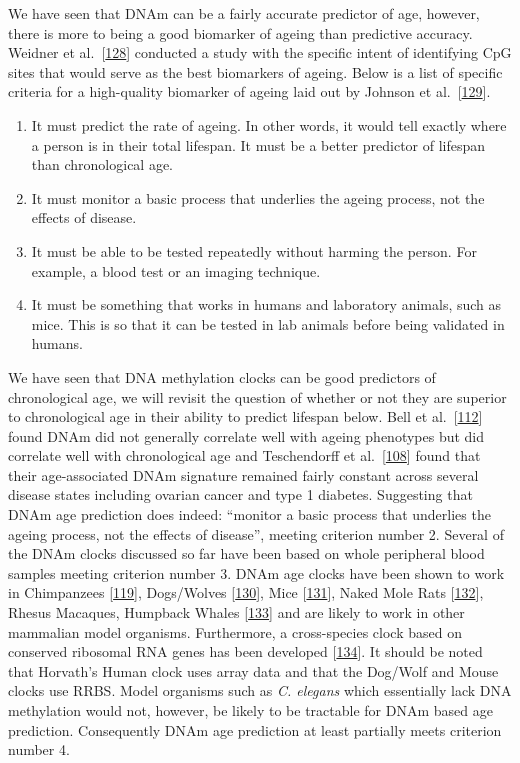 \documentclass[
]{book}
\providecommand{\tightlist}{%
  \setlength{\itemsep}{0pt}\setlength{\parskip}{0pt}}
\begin{document}
We have seen that DNAm can be a fairly accurate predictor of age, however, there is more to being a good biomarker of ageing than predictive accuracy.
Weidner et al.~{[}\protect\hyperlink{ref-Weidner2014}{128}{]} conducted a study with the specific intent of identifying CpG sites that would serve as the best biomarkers of ageing.
Below is a list of specific criteria for a high-quality biomarker of ageing laid out by Johnson et al.~{[}\protect\hyperlink{ref-Johnson2006}{129}{]}.

\begin{enumerate}
\def\labelenumi{\arabic{enumi}.}
\tightlist
\item
  It must predict the rate of ageing. In other words, it would tell exactly where a person is in their total lifespan. It must be a better predictor of lifespan than chronological age.
\item
  It must monitor a basic process that underlies the ageing process, not the effects of disease.
\item
  It must be able to be tested repeatedly without harming the person. For example, a blood test or an imaging technique.
\item
  It must be something that works in humans and laboratory animals, such as mice. This is so that it can be tested in lab animals before being validated in humans.
\end{enumerate}

We have seen that DNA methylation clocks can be good predictors of chronological age, we will revisit the question of whether or not they are superior to chronological age in their ability to predict lifespan below.
Bell et al.~{[}\protect\hyperlink{ref-Bell2012}{112}{]} found DNAm did not generally correlate well with ageing phenotypes but did correlate well with chronological age and Teschendorff et al.~{[}\protect\hyperlink{ref-Teschendorff2010}{108}{]} found that their age-associated DNAm signature remained fairly constant across several disease states including ovarian cancer and type 1 diabetes.
Suggesting that DNAm age prediction does indeed: ``monitor a basic process that underlies the ageing process, not the effects of disease'', meeting criterion number 2.
Several of the DNAm clocks discussed so far have been based on whole peripheral blood samples meeting criterion number 3. DNAm age clocks have been shown to work in Chimpanzees {[}\protect\hyperlink{ref-Horvath2013}{119}{]}, Dogs/Wolves {[}\protect\hyperlink{ref-Thompson2017}{130}{]}, Mice {[}\protect\hyperlink{ref-Stubbs2017}{131}{]}, Naked Mole Rats {[}\protect\hyperlink{ref-Lowe2020}{132}{]}, Rhesus Macaques, Humpback Whales {[}\protect\hyperlink{ref-Lowe2018}{133}{]} and are likely to work in other mammalian model organisms.
Furthermore, a cross-species clock based on conserved ribosomal RNA genes has been developed {[}\protect\hyperlink{ref-Wang2019}{134}{]}.
It should be noted that Horvath's Human clock uses array data and that the Dog/Wolf and Mouse clocks use RRBS.
Model organisms such as \emph{C. elegans} which essentially lack DNA methylation would not, however, be likely to be tractable for DNAm based age prediction.
Consequently DNAm age prediction at least partially meets criterion number 4.
\end{document}
